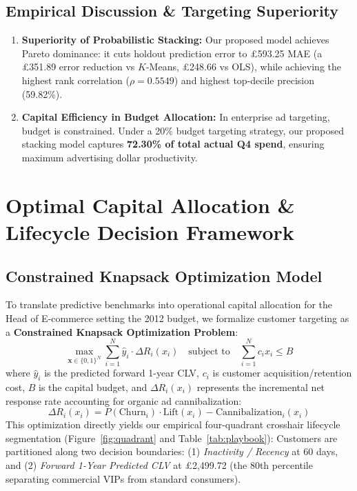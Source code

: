 \documentclass[sigconf,nonacm]{acmart}
\begin{document}
\subsection{Empirical Discussion \& Targeting Superiority}
\begin{enumerate}
    \item \textbf{Superiority of Probabilistic Stacking:} Our proposed model achieves Pareto dominance: it cuts holdout prediction error to £593.25 MAE (a £351.89 error reduction vs $K$-Means, £248.66 vs OLS), while achieving the highest rank correlation ($\rho = 0.5549$) and highest top-decile precision (59.82\%).
    \item \textbf{Capital Efficiency in Budget Allocation:} In enterprise ad targeting, budget is constrained. Under a 20\% budget targeting strategy, our proposed stacking model captures \textbf{72.30\% of total actual Q4 spend}, ensuring maximum advertising dollar productivity.
\end{enumerate}

\section{Optimal Capital Allocation \& Lifecycle Decision Framework}

\subsection{Constrained Knapsack Optimization Model}
To translate predictive benchmarks into operational capital allocation for the Head of E-commerce setting the 2012 budget, we formalize customer targeting as a \textbf{Constrained Knapsack Optimization Problem}:
\begin{equation}
\max_{\mathbf{x} \in \{0, 1\}^N} \sum_{i=1}^N \hat{y}_i \cdot \Delta R_i(x_i) \quad \text{subject to} \quad \sum_{i=1}^N c_i x_i \leq B
\end{equation}
where $\hat{y}_i$ is the predicted forward 1-year CLV, $c_i$ is customer acquisition/retention cost, $B$ is the capital budget, and $\Delta R_i(x_i)$ represents the incremental net response rate accounting for organic ad cannibalization:
\begin{equation}
\Delta R_i(x_i) = P(\mathrm{Churn}_i) \cdot \mathrm{Lift}(x_i) - \mathrm{Cannibalization}_i(x_i)
\end{equation}
This optimization directly yields our empirical four-quadrant crosshair lifecycle segmentation (Figure~\ref{fig:quadrant} and Table~\ref{tab:playbook}):
Customers are partitioned along two decision boundaries: (1) \textit{Inactivity / Recency} at 60 days, and (2) \textit{Forward 1-Year Predicted CLV} at £2,499.72 (the 80th percentile separating commercial VIPs from standard consumers).
\end{document}
